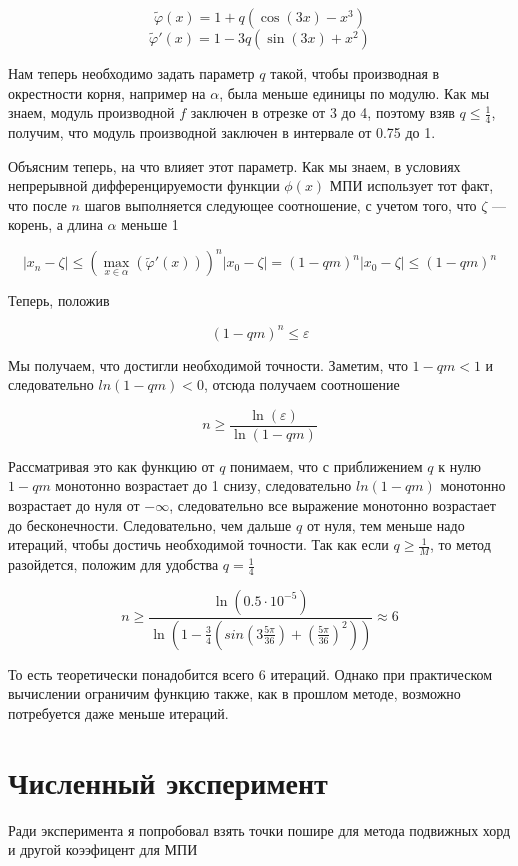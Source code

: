 \documentclass[11pt,a4paper,oneside]{article}
\begin{document}
$$ \widetilde{\varphi}(x) = 1 + q (\cos(3x) - x^3) $$
$$ \widetilde{\varphi}'(x) = 1 - 3 q (\sin(3x) + x^2) $$

Нам теперь необходимо задать параметр $q$ такой, чтобы производная в окрестности корня, например на $\alpha$, была меньше единицы по модулю. Как мы знаем, модуль производной $f$ заключен в отрезке от 3 до 4, поэтому взяв $q \le \frac{1}{4}$, получим, что модуль производной заключен в интервале от 0.75 до 1.

Объясним теперь, на что влияет этот параметр. Как мы знаем, в условиях непрерывной дифференцируемости функции $\phi(x)$ МПИ использует тот факт, что после $n$ шагов выполняется следующее соотношение, с учетом того, что $\zeta$ --- корень, а длина $\alpha$ меньше 1

$$ |x_n - \zeta| \le \left( \max_{x \in \alpha}(\widetilde{\varphi}'(x)) \right)^{n} |x_0 - \zeta|
	= \left(1 - qm\right)^n |x_0 - \zeta| \le (1 - qm)^n $$
	
Теперь, положив

$$ (1 - qm)^n \le \varepsilon $$

Мы получаем, что достигли необходимой точности. Заметим, что $1 - qm < 1$ и следовательно $ln(1 - qm) < 0$, отсюда получаем соотношение

$$ n \ge \frac{\ln(\varepsilon)}{\ln(1 - qm)} $$

Рассматривая это как функцию от $q$ понимаем, что с приближением $q$ к нулю $1 - qm$ монотонно возрастает до 1 снизу, следовательно $ln(1 - qm)$ монотонно возрастает до нуля от $-\infty$, следовательно все выражение монотонно возрастает до бесконечности. Следовательно, чем дальше $q$ от нуля, тем меньше надо итераций, чтобы достичь необходимой точности. Так как если $q \ge \frac{1}{M}$, то метод разойдется, положим для удобства $q = \frac{1}{4}$

$$ n \ge \frac{\ln(0.5 \cdot 10^{-5})}{\ln(1 - \frac{3}{4} (sin(3 \frac{5 \pi}{36})+(\frac{5 \pi}{36})^2))} \approx 6 $$

То есть теоретически понадобится всего 6 итераций. Однако при практическом вычислении ограничим функцию также, как в прошлом методе, возможно потребуется даже меньше итераций.

\section{Численный эксперимент}

Ради эксперимента я попробовал взять точки пошире для метода подвижных хорд и другой коээфицент для МПИ
\end{document}
